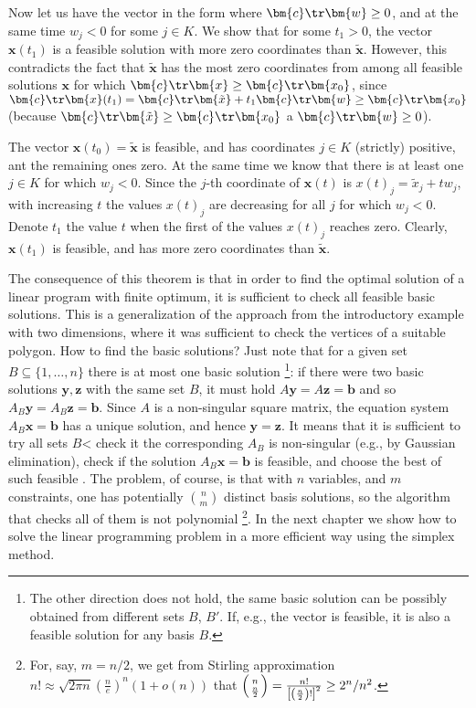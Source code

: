 \begin{dokaz}
\noindent
Now let us have the vector  in the form where $\bm{c}\tr\bm{w}\ge0$,
and at the same time $w_j<0$ for some $j\in K$.
We show that for some  $t_1>0$, the vector $\bm{x}(t_1)$
is a feasible solution with more zero coordinates than $\bm{\tilde{x}}$.
However, this contradicts the fact that  $\bm{\tilde{x}}$ has the most
zero coordinates from among all feasible solutions $\bm{x}$ for which
$\bm{c}\tr\bm{x}\ge\bm{c}\tr\bm{x_0}$, since 
$\bm{c}\tr\bm{x}(t_1)=\bm{c}\tr\bm{\tilde{x}}+t_1\bm{c}\tr\bm{w}\ge\bm{c}\tr\bm{x_0}$
(because $\bm{c}\tr\bm{\tilde{x}}\ge\bm{c}\tr\bm{x_0}$ a $\bm{c}\tr\bm{w}\ge0$).

The vector $\bm{x}(t_0)=\bm{\tilde{x}}$ 
is feasible, and has coordinates $j\in K$ (strictly) positive,
ant the remaining ones zero. At the same time we know that there is at least one
$j\in K$ for which  $w_j<0$.
Since the $j$-th coordinate of  $\bm{x}(t)$ is $x(t)_j=\tilde{x}_j+tw_j$,
with increasing $t$ the values  $x(t)_j$
are decreasing for all $j$ for which $w_j<0$. Denote $t_1$ the value $t$ when the first
of the values  $x(t)_j$ reaches zero. Clearly,  $\bm{x}(t_1)$
is feasible, and has more zero coordinates than  $\bm{\tilde{x}}$.
\end{dokaz}

\noindent 
The consequence of this theorem is that in order to find the optimal solution
of a linear program with finite optimum, it is sufficient to check all 
feasible basic solutions. This is a generalization of the approach from the
introductory example with two dimensions, where it was sufficient to check
the vertices of a suitable polygon. How to find the basic solutions?
Just note that for a given set 
$B\subseteq\{1,\ldots,n\}$ 
there is at most one basic solution
\footnote{The other direction does not hold, the same basic solution 
  can be possibly obtained from different sets $B$, $B'$. If, e.g., the 
  vector  is feasible, it is also a feasible solution for any basis
$B$.}: if there were two basic solutions  $\bm{y},\bm{z}$ with the same set $B$,
it must hold $A\bm{y}=A\bm{z}=\bm{b}$ and so $A_B\bm{y}=A_B\bm{z}=\bm{b}$.
Since $A$ is a non-singular square matrix, the equation system $A_B\bm{x}=\bm{b}$ 
has a unique solution, and hence $\bm{y}=\bm{z}$.
It means that it is sufficient to try all sets $B$< check it the corresponding $A_B$ is non-singular
(e.g., by Gaussian elimination), check if the solution  $A_B\bm{x}=\bm{b}$ is feasible, and choose
the best of such feasible .
The problem, of course, is that with $n$ variables, and $m$ constraints, one has potentially ${n\choose m}$
distinct basis solutions, so the algorithm that checks all of them is not polynomial
\footnote{For, say, $m=n/2$, we get from Stirling approximation 
  $n!\approx\sqrt{2\pi n}\left(\frac{n}{e}\right)^n\left(1+o(n)\right)$ 
 that 
\hbox{$\left(n\atop \frac{n}{2}\right)=\frac{n!}{\left[\left(\frac{n}{2}\right)!\right]^2}\ge 2^n/n^2$.}}.
In the next chapter we show how to solve the linear programming problem in a more efficient way using
the simplex method.


